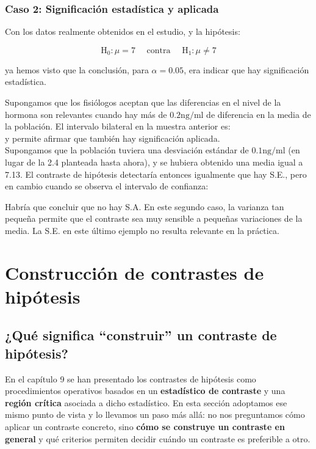 \documentclass[
]{article}
\begin{document}
\subsubsection{Caso 2: Significación estadística y aplicada}\label{caso-2-significaciuxf3n-estaduxedstica-y-aplicada}

Con los datos realmente obtenidos en el estudio, y la hipótesis:

\[
\mathrm{H}_{0}: \mu=7 \quad \text { contra } \quad \mathrm{H}_{1}: \mu \neq 7
\]

ya hemos visto que la conclusión, para \(\alpha=0.05\), era indicar que hay significación estadística.

Supongamos que los fisiólogos aceptan que las diferencias en el nivel de la hormona son relevantes cuando hay más de \(0.2 \mathrm{ng} / \mathrm{ml}\) de diferencia en la media de la población. El intervalo bilateral en la muestra anterior es:\\
y permite afirmar que también hay significación aplicada.\\
Supongamos que la población tuviera una desviación estándar de \(0.1 \mathrm{ng} / \mathrm{ml}\) (en lugar de la 2.4 planteada hasta ahora), y se hubiera obtenido una media igual a 7.13. El contraste de hipótesis detectaría entonces igualmente que hay S.E., pero en cambio cuando se observa el intervalo de confianza:

Habría que concluir que no hay S.A. En este segundo caso, la varianza tan pequeña permite que el contraste sea muy sensible a pequeñas variaciones de la media. La S.E. en este último ejemplo no resulta relevante en la práctica.

\newpage

\section{Construcción de contrastes de hipótesis}\label{construcciuxf3n-de-contrastes-de-hipuxf3tesis}

\subsection{¿Qué significa ``construir'' un contraste de hipótesis?}\label{quuxe9-significa-construir-un-contraste-de-hipuxf3tesis}

En el capítulo 9 se han presentado los contrastes de hipótesis como procedimientos operativos basados en un \textbf{estadístico de contraste} y una \textbf{región crítica} asociada a dicho estadístico. En esta sección adoptamos ese mismo punto de vista y lo llevamos un paso más allá: no nos preguntamos cómo aplicar un contraste concreto, sino \textbf{cómo se construye un contraste en general} y qué criterios permiten decidir cuándo un contraste es preferible a otro.
\end{document}

